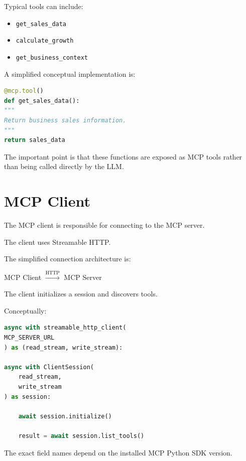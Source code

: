 \documentclass[11pt,a4paper]{article}
\begin{document}
Typical tools can include:

\begin{itemize}
\item \texttt{get_sales_data}
\item \texttt{calculate_growth}
\item \texttt{get_business_context}
\end{itemize}

A simplified conceptual implementation is:

\begin{lstlisting}[style=python,language=Python]
@mcp.tool()
def get_sales_data():
"""
Return business sales information.
"""
return sales_data
\end{lstlisting}

The important point is that these functions are exposed as MCP tools
rather than being called directly by the LLM.

\section{MCP Client}

The MCP client is responsible for connecting to the MCP server.

The client uses Streamable HTTP.

The simplified connection architecture is:

\begin{center}
MCP Client
$\xrightarrow{\text{HTTP}}$
MCP Server
\end{center}

The client initializes a session and discovers tools.

Conceptually:

\begin{lstlisting}[style=python,language=Python]
async with streamable_http_client(
MCP_SERVER_URL
) as (read_stream, write_stream):

async with ClientSession(
    read_stream,
    write_stream
) as session:

    await session.initialize()

    result = await session.list_tools()


\end{lstlisting}

The exact field names depend on the installed MCP Python SDK version.
\end{document}

